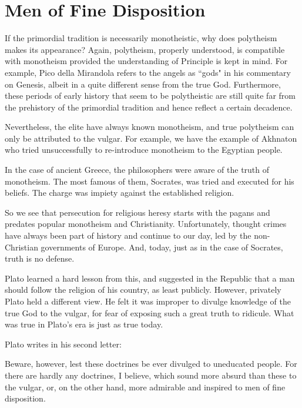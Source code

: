 \section{Men of Fine Disposition}

If the primordial tradition is necessarily monotheistic, why does polytheism makes its appearance? Again, polytheism, properly understood, is compatible with monotheism provided the understanding of Principle is kept in mind. For example, Pico della Mirandola refers to the angels as ``gods" in his commentary on Genesis, albeit in a quite different sense from the true God. Furthermore, these periods of early history that seem to be polytheistic are still quite far from the prehistory of the primordial tradition and hence reflect a certain decadence. 

Nevertheless, the elite have always known monotheism, and true polytheism can only be attributed to the vulgar. For example, we have the example of Akhnaton who tried unsuccessfully to re-introduce monotheism to the Egyptian people. 

In the case of ancient Greece, the philosophers were aware of the truth of monotheism. The most famous of them, Socrates, was tried and executed for his beliefs. The charge was impiety against the established religion. 

So we see that persecution for religious heresy starts with the pagans and predates popular monotheism and Christianity. Unfortunately, thought crimes have always been part of history and continue to our day, led by the non-Christian governments of Europe. And, today, just as in the case of Socrates, truth is no defense. 

Plato learned a hard lesson from this, and suggested in the Republic that a man should follow the religion of his country, as least publicly. However, privately Plato held a different view. He felt it was improper to divulge knowledge of the true God to the vulgar, for fear of exposing such a great truth to ridicule. What was true in Plato's era is just as true today. 

Plato writes in his second letter: 

\begin{quotex}
Beware, however, lest these doctrines be ever divulged to uneducated people. For there are hardly any doctrines, I believe, which sound more absurd than these to the vulgar, or, on the other hand, more admirable and inspired to men of fine disposition. 

\end{quotex}


